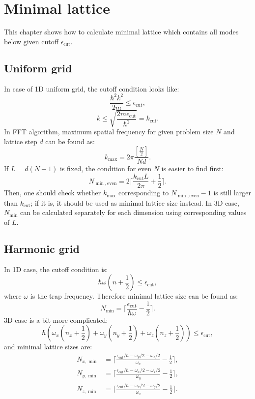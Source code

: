 \chapter{Minimal lattice}
\label{cha:appendix:minimal-lattice}

\newcommand{\ecut}{\epsilon_{\mathrm{cut}}}

This chapter shows how to calculate minimal lattice which contains all modes below given cutoff $\ecut$.


\section{Uniform grid}

In case of 1D uniform grid, the cutoff condition looks like:
\[
	\frac{\hbar^2 k^2}{2 m} \le \ecut,
\]
\[
	k \le \sqrt{\frac{2 m \ecut}{\hbar^2}} = k_{\mathrm{cut}}.
\]
In FFT algorithm, maximum spatial frequency for given problem size $N$ and lattice step $d$ can be found as:
\[
	k_{\max} = 2 \pi \frac{ \left[ \frac{N}{2} \right] }{N d}.
\]
If $L = d (N - 1)$ is fixed, the condition for even $N$ is easier to find first:
\[
	N_{\min,\mathrm{even}} = 2 \lceil
		\frac{k_{\mathrm{cut}} L}{2 \pi} + \frac{1}{2}
	\rceil.
\]
Then, one should check whether $k_{\max}$ corresponding to $N_{\min,\mathrm{even}} - 1$ is still larger than $k_{\mathrm{cut}}$; if it is, it should be used as minimal lattice size instead.
In 3D case, $N_{\min}$ can be calculated separately for each dimension using corresponding values of $L$.


\section{Harmonic grid}

In 1D case, the cutoff condition is:
\[
	\hbar \omega ( n + \frac{1}{2} ) \le \ecut,
\]
where $\omega$ is the trap frequency.
Therefore minimal lattice size can be found as:
\[
	N_{\min} = \lceil \frac{\ecut}{\hbar \omega} - \frac{1}{2} \rceil.
\]
3D case is a bit more complicated:
\[
	\hbar \left(
		\omega_x (n_x + \frac{1}{2})
		+ \omega_y (n_y + \frac{1}{2})
		+ \omega_z (n_z + \frac{1}{2})
	\right) \le \ecut,
\]
and minimal lattice sizes are:
\begin{equation*}
\begin{split}
	N_{x,\min} & = \lceil
		\frac{\ecut / \hbar - \omega_y / 2 - \omega_z / 2}{\omega_x} - \frac{1}{2}
	\rceil, \\
	N_{y,\min} & = \lceil
		\frac{\ecut / \hbar - \omega_x / 2 - \omega_z / 2}{\omega_y} - \frac{1}{2}
	\rceil, \\
	N_{z,\min} & = \lceil
		\frac{\ecut / \hbar - \omega_x / 2 - \omega_y / 2}{\omega_z} - \frac{1}{2}
	\rceil.
\end{split}
\end{equation*}
